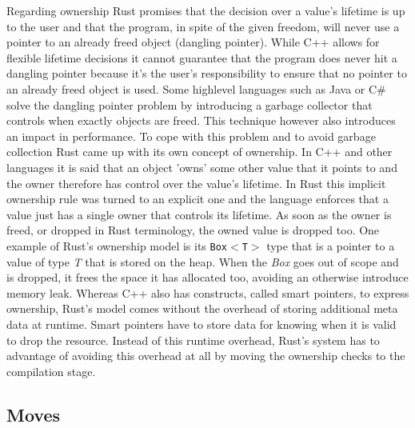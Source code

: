 Regarding ownership Rust promises that the decision over a value's lifetime is up to the user and that the program, in spite of the given freedom, will never use a pointer to an already freed object (dangling pointer). While C++ allows for flexible lifetime decisions it cannot guarantee that the program does never hit a dangling pointer because it's the user's responsibility to ensure that no pointer to an already freed object is used.
Some highlevel languages such as Java or C\# solve the dangling pointer problem by introducing a garbage collector that controls when exactly objects are freed. This technique however also introduces an impact in performance.
To cope with this problem and to avoid garbage collection Rust came up with its own concept of ownership. In C++ and other languages it is said that an object 'owns' some other value that it points to and the owner therefore has control over the value's lifetime. In Rust this implicit ownership rule was turned to an explicit one and the language enforces that a value just has a single owner that controls its lifetime. As soon as the owner is freed, or dropped in Rust terminology, the owned value is dropped too. One example of Rust's ownership model is its \texttt{Box$<$T$>$} type that is a pointer to a value of type \textit{T} that is stored on the heap. When the \textit{Box} goes out of scope and is dropped, it frees the space it has allocated too, avoiding an otherwise introduce memory leak. \cite[Chapter 4. Ownership]{ProgrammingRust}
Whereas C++ also has constructs, called smart pointers, to express ownership, Rust's model comes without the overhead of storing additional meta data at runtime. Smart pointers have to store data for knowing when it is valid to drop the resource. Instead of this runtime overhead, Rust's system has to advantage of avoiding this overhead at all by moving the ownership checks to the compilation stage.

\subsection{Moves}

